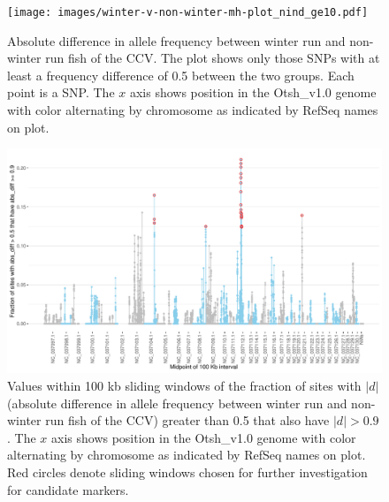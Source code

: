 \begin{figure}
\texttt{[image: images/winter-v-non-winter-mh-plot\_nind\_ge10.pdf]}
\caption[
	Absolute difference in allele frequency between winter run and non-winter run fish
]{
	\footnotesize Absolute difference in allele frequency between winter run and non-winter run fish of the CCV.
	The plot shows only those SNPs with at least a frequency difference of 0.5 between the two groups. Each point
	is a SNP. The  $x$ axis shows position in the Otsh\_v1.0 genome
	with color alternating by chromosome as indicated by RefSeq names on plot.
}
\label{fig:wrap-absdiff}
\end{figure}



\begin{figure}
\includegraphics[width=\textwidth]{images/wrap-slide-window.pdf}
\caption[
	Sliding windows of absolute allele frequency difference between winter run and others
]{
	\footnotesize Values within 100 kb sliding windows of the fraction of sites with $|d|$ (absolute difference in
	allele frequency between winter run and non-winter run fish of the CCV) greater than 0.5 that also have
	$|d|>0.9$. The  $x$ axis shows position in the Otsh\_v1.0 genome
	with color alternating by chromosome as indicated by RefSeq names on plot. Red circles denote sliding
	windows chosen for further investigation for candidate markers.
}
\label{fig:wrap-slide-window}
\end{figure}





